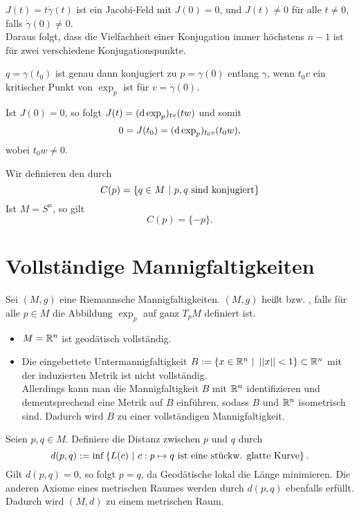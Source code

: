 \Bem{}
$J(t) = t\dot{\gamma}(t)$ ist ein Jacobi-Feld mit $J(0) = 0$, und $J(t) \neq 0$ für alle $t\neq 0$, falls $\dot{\gamma} (0) \neq 0$.\\
Daraus folgt, dass die Vielfachheit einer Konjugation immer höchstens $n-1$ ist für zwei verschiedene Konjugationspunkte.

\Prop{}
$q = \gamma(t_0)$ ist genau dann konjugiert zu $p = \gamma(0)$ entlang $\gamma$, wenn $t_0v$ ein kritischer Punkt von $\exp_{p}$ ist für $v = \dot{\gamma}(0)$.
\begin{Beweis}{}
Ist $J(0) = 0$, so folgt $J(t) = (\text{d} \exp_p)_{tv}(tw)$ und somit
\[ 
0 = J(t_0) = (\text{d} \exp_p)_{t_0v}(t_0w),
 \]
wobei $t_0w \neq 0$.
\end{Beweis}

\Def{}
Wir definieren den  durch
\[ C(p) = \set{q \in M}{p, q \text{ sind konjugiert}} \]
\Bsp{}
Ist $M= S^n$, so gilt
\[ C(p) = \{-p\}. \]

\newpage
\section{Vollständige Mannigfaltigkeiten}
Sei $(M,g)$ eine Riemannsche Mannigfaltigkeiten.
\Def{}
$(M,g)$ heißt  bzw. , falls für alle $p \in M$ die Abbildung $\exp_p$ auf ganz $T_pM$ definiert ist.

\Bsp{}
\begin{itemize}
	\item $M = \mathbb{R}^n$ ist geodätisch vollständig.
	\item Die eingebettete Untermannigfaltigkeit $B := \set{x \in \R^n}{\norm{x} < 1} \subset \R^n$ mit der induzierten Metrik ist nicht vollständig.\\
	Allerdings kann man die Mannigfaltigkeit $B$ mit $\mathbb{R}^n$ identifizieren und dementsprechend eine Metrik auf $B$ einführen, sodass $B $ und $ \mathbb{R}^n$ isometrisch sind. Dadurch wird $B$ zu einer vollständigen Mannigfaltigkeit.
\end{itemize}

\Def{}
Seien $p,q \in M.$ Definiere die Distanz zwischen $p$ und $q$ durch
\[ d(p,q) := \inf \set{L(c)}{ c:p\mapsto q \text{ ist eine stückw. glatte Kurve} }. \]
Gilt $d(p,q) = 0$, so folgt $p = q$, da Geodätische lokal die Länge minimieren. Die anderen Axiome eines metrischen Raumes werden durch $d(p,q)$ ebenfalls erfüllt.\\
Dadurch wird $(M,d)$ zu einem metrischen Raum.
